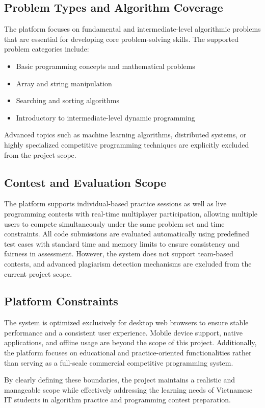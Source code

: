 \subsection*{Problem Types and Algorithm Coverage}

The platform focuses on fundamental and intermediate-level algorithmic problems that are essential for developing core problem-solving skills. The supported problem categories include:
\begin{itemize}
    \item Basic programming concepts and mathematical problems
    \item Array and string manipulation
    \item Searching and sorting algorithms
    \item Introductory to intermediate-level dynamic programming
\end{itemize}

Advanced topics such as machine learning algorithms, distributed systems, or highly specialized competitive programming techniques are explicitly excluded from the project scope.

\subsection*{Contest and Evaluation Scope}

The platform supports individual-based practice sessions as well as live programming contests with real-time multiplayer participation, allowing multiple users to compete simultaneously under the same problem set and time constraints. All code submissions are evaluated automatically using predefined test cases with standard time and memory limits to ensure consistency and fairness in assessment. However, the system does not support team-based contests, and advanced plagiarism detection mechanisms are excluded from the current project scope.
\subsection*{Platform Constraints}

The system is optimized exclusively for desktop web browsers to ensure stable performance and a consistent user experience. Mobile device support, native applications, and offline usage are beyond the scope of this project. Additionally, the platform focuses on educational and practice-oriented functionalities rather than serving as a full-scale commercial competitive programming system.

By clearly defining these boundaries, the project maintains a realistic and manageable scope while effectively addressing the learning needs of Vietnamese IT students in algorithm practice and programming contest preparation.


\newpage
